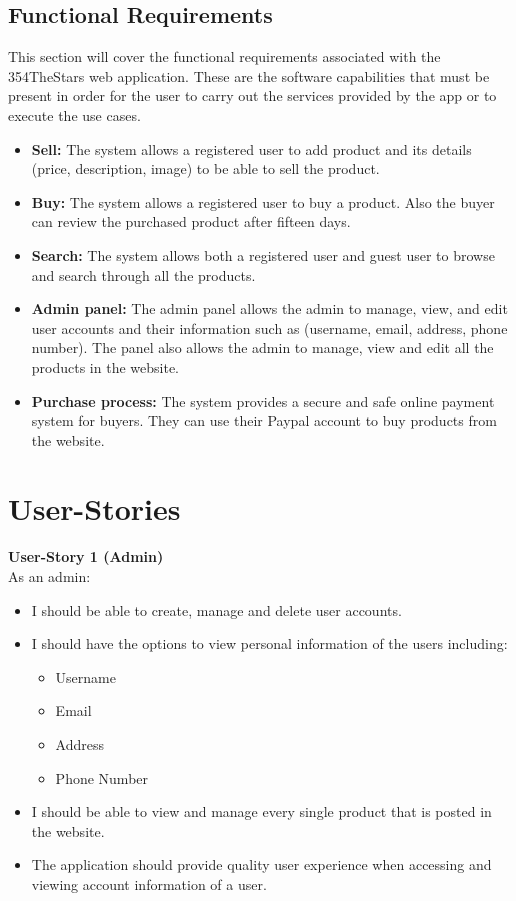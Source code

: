 \documentclass[11pt]{article}
\newcounter{use case ID}
\newcounter{req ID}
\begin{document}
\subsection{Functional Requirements} \label{func req}

This section will cover the functional requirements associated with the 354TheStars web application. These are the software capabilities that must be present in order for the user to carry out the services provided by the app or to execute the use cases.

\begin{itemize}
    \item \textbf{Sell:} The system allows a registered user to add product and its details (price, description, image) to be able to sell the product.
    \item \textbf{Buy:} The system allows a registered user to buy a product. Also the buyer can review the purchased product after fifteen days.
    \item  \textbf{Search:} The system allows both a registered user and guest user to browse and search through all the products.
    \item  \textbf{Admin panel:} The admin panel allows the admin to manage, view, and edit user accounts and their information such as (username, email, address, phone number). The panel also allows the admin to manage, view and edit all the products in the website.
    \item \textbf{Purchase process:} The system provides a secure and safe online payment system for buyers. They can use their Paypal account to buy products from the website.
\end{itemize}

\clearpage

\section{User-Stories}

\textbf{User-Story 1 (Admin)} \\
As an admin:
\begin{itemize}
   \item I should be able to create, manage and delete user accounts.
    \item I should have the options to view personal information of the users including:
        \begin{itemize}
            \item Username
            \item Email
            \item Address
            \item Phone Number
        \end{itemize}
    \item I should be able to view and manage every single product that is posted in the website.
    \item The application should provide quality user experience when accessing and viewing account information of a user.
\end{itemize}
\end{document}
